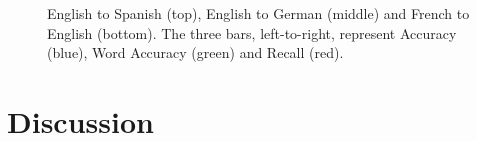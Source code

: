 \begin{figure}[p]
\noindent{}
\noindent{}
\noindent{}
\caption{English to Spanish (top), English to German (middle) and French to English (bottom). The three bars, left-to-right, represent Accuracy (blue), Word Accuracy (green) and Recall (red).}
\label{fig:graphs}
\end{figure}

\section{Discussion}

